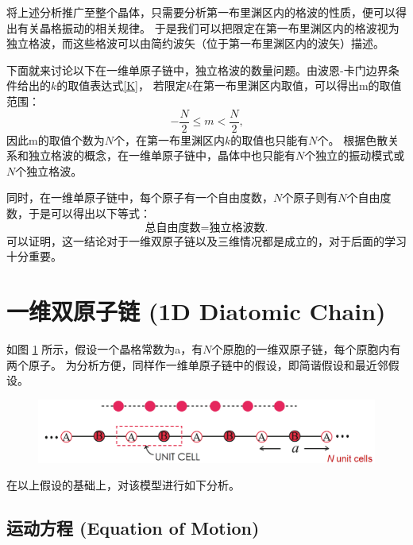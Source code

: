 \documentclass[declarePage]{ecnuthesis}
\begin{document}
将上述分析推广至整个晶体，只需要分析第一布里渊区内的格波的性质，便可以得出有关晶格振动的相关规律。%
于是我们可以把限定在第一布里渊区内的格波视为独立格波，而这些格波可以由简约波矢（位于第一布里渊区内的波矢）描述。

下面就来讨论以下在一维单原子链中，独立格波的数量问题。由波恩-卡门边界条件给出的$k$的取值表达式\ref{K}，%
若限定$k$在第一布里渊区内取值，可以得出m的取值范围：
\begin{equation}
    -\frac{N}{2} \le m < \frac{N}{2} \text{,}
\end{equation}
因此m的取值个数为$N$个，在第一布里渊区内$k$的取值也只能有$N$个。
根据色散关系和独立格波的概念，在一维单原子链中，晶体中也只能有$N$个独立的振动模式或$N$个独立格波。

同时，在一维单原子链中，每个原子有一个自由度数，$N$个原子则有$N$个自由度数，于是可以得出以下等式：
\begin{equation}
    \text{总自由度数}=\text{独立格波数} \text{.} \label{3PN}
\end{equation}
可以证明，这一结论对于一维双原子链以及三维情况都是成立的，对于后面的学习十分重要。

\section{一维双原子链 (1D Diatomic Chain)}

如图 \ref{1DDC} 所示，假设一个晶格常数为a，有$N$个原胞的一维双原子链，每个原胞内有两个原子。
为分析方便，同样作一维单原子链中的假设，即简谐假设和最近邻假设。
\begin{figure}[htb]
    \centering
    \includegraphics[width=.7\textwidth]{1DDC.png}
    \label{1DDC}
\end{figure}

在以上假设的基础上，对该模型进行如下分析。

\subsection{运动方程 (Equation of Motion)}
\end{document}
